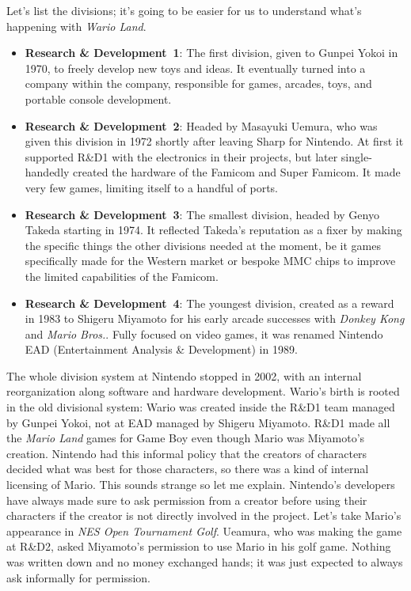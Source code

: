\documentclass{book}
\begin{document}
Let’s list the divisions; it’s going to be easier for us to understand what’s happening with \emph{Wario Land}.

\begin{itemize} [nosep]
\item \textbf{Research \& Development 1}: The first division, given to Gunpei Yokoi in 1970, to freely develop new toys and ideas. It eventually turned into a company within the company, responsible for games, arcades, toys, and portable console development.
\item \textbf{Research \& Development 2}: Headed by Masayuki Uemura, who was given this division in 1972 shortly after leaving Sharp for Nintendo. At first it supported R\&D1 with the electronics in their projects, but later single-handedly created the hardware of the Famicom and Super Famicom. It made very few games, limiting itself to a handful of ports.
\item \textbf{Research \& Development 3}: The smallest division, headed by Genyo Takeda starting in 1974. It reflected Takeda’s reputation as a fixer by making the specific things the other divisions needed at the moment, be it games specifically made for the Western market or bespoke MMC chips to improve the limited capabilities of the Famicom.
\item \textbf{Research \& Development 4}: The youngest division, created as a reward in 1983 to Shigeru Miyamoto for his early arcade successes with \emph{Donkey Kong} and \emph{Mario Bros.}. Fully focused on video games, it was renamed Nintendo EAD (Entertainment Analysis \& Development) in 1989.
\end{itemize}\noindent

The whole division system at Nintendo stopped in 2002, with an internal reorganization along software and hardware development. Wario’s birth is rooted in the old divisional system: Wario was created inside the R\&D1 team managed by Gunpei Yokoi, not at EAD managed by Shigeru Miyamoto. R\&D1 made all the \emph{Mario Land} games for Game Boy even though Mario was Miyamoto’s creation. Nintendo had this informal policy that the creators of characters decided what was best for those characters, so there was a kind of internal licensing of Mario. This sounds strange so let me explain. Nintendo’s developers have always made sure to ask permission from a creator before using their characters if the creator is not directly involved in the project. Let’s take Mario’s appearance in \emph{NES Open Tournament Golf}. Ueamura, who was making the game at R\&D2, asked Miyamoto’s permission to use Mario in his golf game. Nothing was written down and no money exchanged hands; it was just expected to always ask informally for permission.
\end{document}
